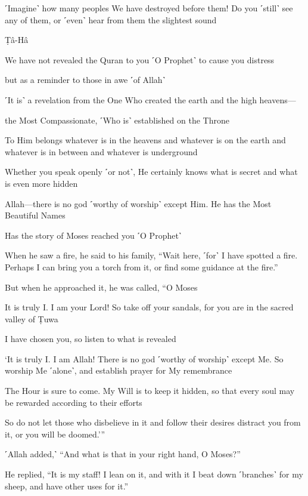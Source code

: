 ˹Imagine˺ how many peoples We have destroyed before them! Do you ˹still˺ see any of them, or ˹even˺ hear from them the slightest sound

Ṭâ-Hâ

We have not revealed the Quran to you ˹O Prophet˺ to cause you distress

but as a reminder to those in awe ˹of Allah˺

˹It is˺ a revelation from the One Who created the earth and the high heavens—

the Most Compassionate, ˹Who is˺ established on the Throne

To Him belongs whatever is in the heavens and whatever is on the earth and whatever is in between and whatever is underground

Whether you speak openly ˹or not˺, He certainly knows what is secret and what is even more hidden

Allah—there is no god ˹worthy of worship˺ except Him. He has the Most Beautiful Names

Has the story of Moses reached you ˹O Prophet˺

When he saw a fire, he said to his family, “Wait here, ˹for˺ I have spotted a fire. Perhaps I can bring you a torch from it, or find some guidance at the fire.”

But when he approached it, he was called, “O Moses

It is truly I. I am your Lord! So take off your sandals, for you are in the sacred valley of Ṭuwa

I have chosen you, so listen to what is revealed

‘It is truly I. I am Allah! There is no god ˹worthy of worship˺ except Me. So worship Me ˹alone˺, and establish prayer for My remembrance

The Hour is sure to come. My Will is to keep it hidden, so that every soul may be rewarded according to their efforts

So do not let those who disbelieve in it and follow their desires distract you from it, or you will be doomed.’”

˹Allah added,˺ “And what is that in your right hand, O Moses?”

He replied, “It is my staff! I lean on it, and with it I beat down ˹branches˺ for my sheep, and have other uses for it.”

